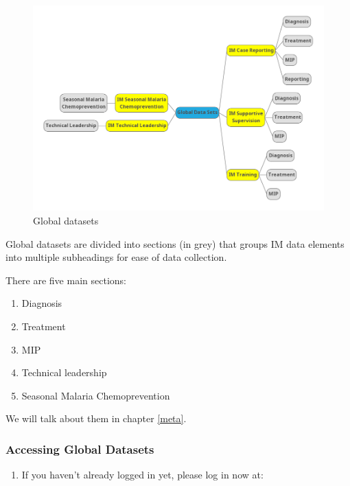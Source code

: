 \documentclass[]{book}
\providecommand{\tightlist}{%
  \setlength{\itemsep}{0pt}\setlength{\parskip}{0pt}}
\begin{document}
\begin{figure}
\includegraphics[width=13.47in]{./images/im datasets} \caption{Global datasets}\label{fig:im-datasets}
\end{figure}

Global datasets are divided into sections (in grey) that groups IM data elements into multiple subheadings for ease of data collection.

There are five main sections:

\begin{enumerate}
\def\labelenumi{\arabic{enumi}.}
\tightlist
\item
  Diagnosis
\item
  Treatment
\item
  MIP
\item
  Technical leadership
\item
  Seasonal Malaria Chemoprevention
\end{enumerate}

We will talk about them in chapter \ref{meta}.

\hypertarget{access-global-datasets}{%
\subsubsection{Accessing Global Datasets}\label{access-global-datasets}}

\begin{enumerate}
\def\labelenumi{\arabic{enumi}.}
\tightlist
\item
  If you haven't already logged in yet, please log in now at:
\end{enumerate}
\end{document}
